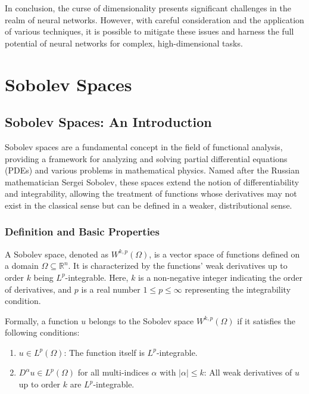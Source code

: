 \documentclass[11pt,a4paper]{article}
\begin{document}
In conclusion, the curse of dimensionality presents significant challenges in the realm of neural networks. However, with careful consideration and the application of various techniques, it is possible to mitigate these issues and harness the full potential of neural networks for complex, high-dimensional tasks.

\section{Sobolev Spaces}

\subsection{Sobolev Spaces: An Introduction}

Sobolev spaces are a fundamental concept in the field of functional analysis, providing a framework for analyzing and solving partial differential equations (PDEs) and various problems in mathematical physics. Named after the Russian mathematician Sergei Sobolev, these spaces extend the notion of differentiability and integrability, allowing the treatment of functions whose derivatives may not exist in the classical sense but can be defined in a weaker, distributional sense.

\subsubsection{Definition and Basic Properties}

A Sobolev space, denoted as \( W^{k,p}(\Omega) \), is a vector space of functions defined on a domain \(\Omega \subseteq \mathbb{R}^n\). It is characterized by the functions' weak derivatives up to order \(k\) being \(L^p\)-integrable. Here, \(k\) is a non-negative integer indicating the order of derivatives, and \(p\) is a real number \(1 \leq p \leq \infty\) representing the integrability condition.

Formally, a function \(u\) belongs to the Sobolev space \( W^{k,p}(\Omega) \) if it satisfies the following conditions:

\begin{enumerate}
    \item \(u \in L^p(\Omega)\): The function itself is \(L^p\)-integrable.
    \item \(D^\alpha u \in L^p(\Omega)\) for all multi-indices \(\alpha\) with \(|\alpha| \leq k\): All weak derivatives of \(u\) up to order \(k\) are \(L^p\)-integrable.
\end{enumerate}
\end{document}
